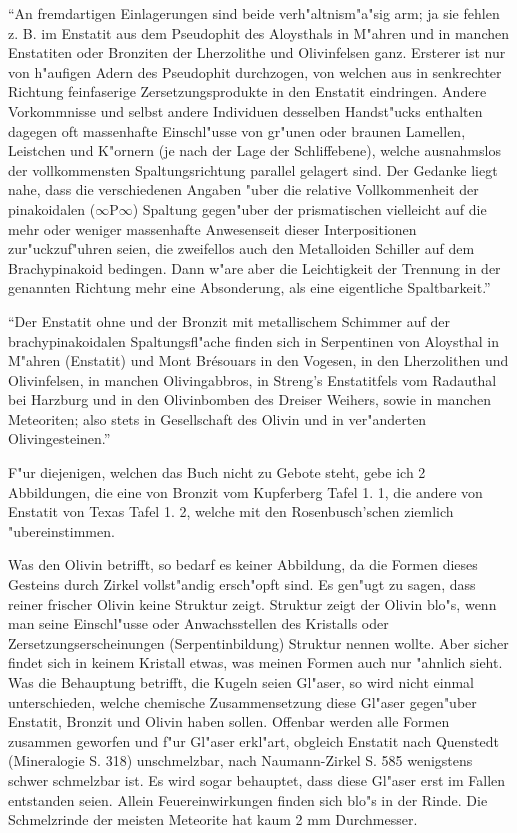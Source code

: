 \documentclass[a4paper, 11pt, oneside]{article}
\begin{document}
"`An fremdartigen Einlagerungen sind beide verh"altnism"a"sig arm; ja sie fehlen z. B. im Enstatit aus dem Pseudophit des Aloysthals in M"ahren und in manchen Enstatiten oder Bronziten der Lherzolithe und Olivinfelsen ganz. Ersterer ist nur von h"aufigen Adern des Pseudophit durchzogen, von welchen aus in senkrechter Richtung feinfaserige Zersetzungsprodukte in den Enstatit eindringen. Andere Vorkommnisse und selbst andere Individuen desselben Handst"ucks enthalten dagegen oft massenhafte Einschl"usse von gr"unen oder braunen Lamellen, Leistchen und K"ornern (je nach der Lage der Schliffebene), welche ausnahmslos der vollkommensten Spaltungsrichtung parallel gelagert sind. Der Gedanke liegt nahe, dass die verschiedenen Angaben "uber die relative Vollkommenheit der pinakoidalen ($\infty$P$\infty$) Spaltung gegen"uber der prismatischen vielleicht auf die mehr oder weniger massenhafte Anwesenseit dieser Interpositionen zur"uckzuf"uhren seien, die zweifellos auch den Metalloiden Schiller auf dem Brachypinakoid bedingen. Dann w"are aber die Leichtigkeit der Trennung in der genannten Richtung mehr eine Absonderung, als eine eigentliche Spaltbarkeit."'

"`Der Enstatit ohne und der Bronzit mit metallischem Schimmer auf der brachypinakoidalen Spaltungsfl"ache finden sich in Serpentinen von Aloysthal in M"ahren (Enstatit) und Mont Brésouars in den Vogesen, in den Lherzolithen und Olivinfelsen, in manchen Olivingabbros, in Streng's Enstatitfels vom Radauthal bei Harzburg und in den Olivinbomben des Dreiser Weihers, sowie in manchen Meteoriten; also stets in Gesellschaft des Olivin und in ver"anderten Olivingesteinen."'

F"ur diejenigen, welchen das Buch nicht zu Gebote steht, gebe ich 2 Abbildungen, die eine von Bronzit vom Kupferberg Tafel 1. 1, die andere von Enstatit von Texas Tafel 1. 2, welche mit den Rosenbusch'schen ziemlich "ubereinstimmen.

Was den Olivin betrifft, so bedarf es keiner Abbildung, da die Formen dieses Gesteins durch Zirkel vollst"andig ersch"opft sind. Es gen"ugt zu sagen, dass reiner frischer Olivin keine Struktur zeigt. Struktur zeigt der Olivin blo"s, wenn man seine Einschl"usse oder Anwachsstellen des Kristalls oder Zersetzungserscheinungen (Serpentinbildung) Struktur nennen wollte. Aber sicher findet sich in keinem Kristall etwas, was meinen Formen auch nur "ahnlich sieht. Was die Behauptung betrifft, die Kugeln seien Gl"aser, so wird nicht einmal unterschieden, welche chemische Zusammensetzung diese Gl"aser gegen"uber Enstatit, Bronzit und Olivin haben sollen. Offenbar werden alle Formen zusammen geworfen und f"ur Gl"aser erkl"art, obgleich Enstatit nach Quenstedt (Mineralogie S. 318) unschmelzbar, nach Naumann-Zirkel S. 585 wenigstens schwer schmelzbar ist. Es wird sogar behauptet, dass diese Gl"aser erst im Fallen entstanden seien. Allein Feuereinwirkungen finden sich blo"s in der Rinde. Die Schmelzrinde der meisten Meteorite hat kaum 2 mm Durchmesser.
\end{document}
